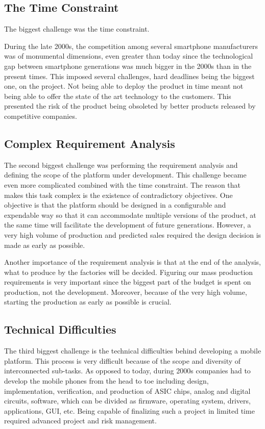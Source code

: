 \documentclass[conference]{IEEEtran}
\begin{document}
\subsection{The Time Constraint}
The biggest challenge was the time constraint. 

During the late 2000s, the competition among several smartphone manufacturers was of monumental dimensions, even greater than today since the technological gap between smartphone generations was much bigger in the 2000s than in the present times. This imposed several challenges, hard deadlines being the biggest one, on the project. Not being able to deploy the product in time meant not being able to offer the state of the art technology to the customers. This presented the risk of the product being obsoleted by better products released by competitive companies.

\subsection{Complex Requirement Analysis}
The second biggest challenge was performing the requirement analysis and defining the scope of the platform under development. This challenge became even more complicated combined with the time constraint. The reason that makes this task complex is the existence of contradictory objectives. One objective is that the platform should be designed in a configurable and expendable way so that it can accommodate multiple versions of the product, at the same time will facilitate the development of future generations. However, a very high volume of production and predicted sales required the design decision is made as early as possible.

Another importance of the requirement analysis is that at the end of the analysis, what to produce by the factories will be decided. Figuring our mass production requirements is very important since the biggest part of the budget is spent on production, not the development. Moreover, because of the very high volume, starting the production as early as possible is crucial. 

\subsection{Technical Difficulties}
The third biggest challenge is the technical difficulties behind developing a mobile platform. This process is very difficult because of the scope and diversity of interconnected sub-tasks. As opposed to today, during 2000s companies had to develop the mobile phones from the head to toe including design, implementation, verification, and production of ASIC chips, analog and digital circuits, software, which can be divided as firmware, operating system, drivers, applications, GUI, etc. Being capable of finalizing such a project in limited time required advanced project and risk management. 
\end{document}
